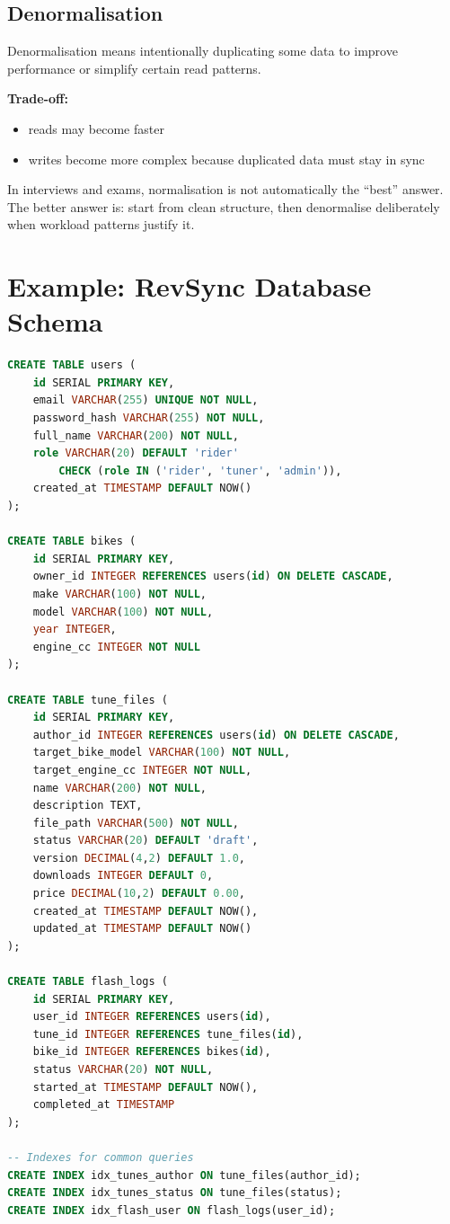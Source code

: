 \documentclass[12pt, a4paper, oneside]{book}
\begin{document}
\subsection{Denormalisation}
Denormalisation means intentionally duplicating some data to improve performance or simplify certain read patterns.

\textbf{Trade-off:}
\begin{itemize}[leftmargin=2em]
    \item reads may become faster
    \item writes become more complex because duplicated data must stay in sync
\end{itemize}

\begin{examtipbox}
In interviews and exams, normalisation is not automatically the ``best'' answer. The better answer is: start from clean structure, then denormalise deliberately when workload patterns justify it.
\end{examtipbox}

\section{Example: RevSync Database Schema}

\begin{lstlisting}[language=SQL, caption={RevSync schema design}]
CREATE TABLE users (
    id SERIAL PRIMARY KEY,
    email VARCHAR(255) UNIQUE NOT NULL,
    password_hash VARCHAR(255) NOT NULL,
    full_name VARCHAR(200) NOT NULL,
    role VARCHAR(20) DEFAULT 'rider'
        CHECK (role IN ('rider', 'tuner', 'admin')),
    created_at TIMESTAMP DEFAULT NOW()
);

CREATE TABLE bikes (
    id SERIAL PRIMARY KEY,
    owner_id INTEGER REFERENCES users(id) ON DELETE CASCADE,
    make VARCHAR(100) NOT NULL,
    model VARCHAR(100) NOT NULL,
    year INTEGER,
    engine_cc INTEGER NOT NULL
);

CREATE TABLE tune_files (
    id SERIAL PRIMARY KEY,
    author_id INTEGER REFERENCES users(id) ON DELETE CASCADE,
    target_bike_model VARCHAR(100) NOT NULL,
    target_engine_cc INTEGER NOT NULL,
    name VARCHAR(200) NOT NULL,
    description TEXT,
    file_path VARCHAR(500) NOT NULL,
    status VARCHAR(20) DEFAULT 'draft',
    version DECIMAL(4,2) DEFAULT 1.0,
    downloads INTEGER DEFAULT 0,
    price DECIMAL(10,2) DEFAULT 0.00,
    created_at TIMESTAMP DEFAULT NOW(),
    updated_at TIMESTAMP DEFAULT NOW()
);

CREATE TABLE flash_logs (
    id SERIAL PRIMARY KEY,
    user_id INTEGER REFERENCES users(id),
    tune_id INTEGER REFERENCES tune_files(id),
    bike_id INTEGER REFERENCES bikes(id),
    status VARCHAR(20) NOT NULL,
    started_at TIMESTAMP DEFAULT NOW(),
    completed_at TIMESTAMP
);

-- Indexes for common queries
CREATE INDEX idx_tunes_author ON tune_files(author_id);
CREATE INDEX idx_tunes_status ON tune_files(status);
CREATE INDEX idx_flash_user ON flash_logs(user_id);
\end{lstlisting}
\end{document}
